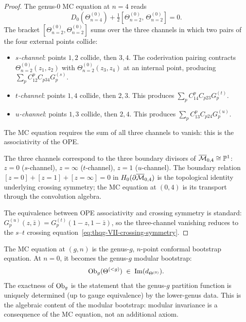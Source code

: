 \begin{proof}
The genus-$0$ MC equation at $n = 4$ reads
\[
D_0(\Theta^{(0)}_{n=4})
+ \tfrac{1}{2}[\Theta^{(0)}_{n=2},\, \Theta^{(0)}_{n=2}]
= 0.
\]
The bracket $[\Theta^{(0)}_{n=2}, \Theta^{(0)}_{n=2}]$
sums over the three channels in which two pairs of the four
external points collide:
\begin{itemize}
\item \emph{$s$-channel}: points $1,2$ collide, then $3,4$.
 The coderivation pairing contracts
 $\Theta^{(0)}_{n=2}(z_1, z_2)$ with
 $\Theta^{(0)}_{n=2}(z_3, z_4)$ at an internal point,
 producing $\sum_p C_{12}^p C_{p34} G_p^{(s)}$.
\item \emph{$t$-channel}: points $1,4$ collide, then $2,3$.
 This produces $\sum_p C_{14}^p C_{p23} G_p^{(t)}$.
\item \emph{$u$-channel}: points $1,3$ collide, then $2,4$.
 This produces $\sum_p C_{13}^p C_{p24} G_p^{(u)}$.
\end{itemize}
The MC equation requires the sum of all three channels to
vanish: this is the associativity of the OPE.

The three channels correspond to the three boundary divisors of
$\overline{\mathcal{M}}_{0,4} \cong \mathbb{P}^1$:
$z = 0$ ($s$-channel), $z = \infty$ ($t$-channel),
$z = 1$ ($u$-channel). The boundary relation
$[z{=}0] + [z{=}1] + [z{=}\infty] = 0$ in
$H_0(\partial\overline{\mathcal{M}}_{0,4})$ is the topological identity
underlying crossing symmetry; the MC equation at $(0,4)$ is its
transport through the convolution algebra.

The equivalence between OPE associativity and crossing symmetry
is standard:
$G_p^{(u)}(z, \bar{z}) = G_p^{(t)}(1-z, 1-\bar{z})$, so
the three-channel vanishing reduces to the
$s$--$t$ crossing equation~\eqref{eq:thqg-VII-crossing-symmetry}.
\end{proof}

\begin{corollary}
\label{cor:thqg-VII-genus-g-bootstrap}
The MC equation at $(g, n)$ is the genus-$g$, $n$-point
conformal bootstrap equation. At $n = 0$, it becomes the
genus-$g$ modular bootstrap:
\begin{equation}\label{eq:thqg-VII-genus-g-bootstrap}
\mathrm{Ob}_g(\Theta^{(<g)}) \;\in\; \mathrm{Im}(d_{\Theta^{(0)}}).
\end{equation}
The exactness of $\mathrm{Ob}_g$ is the statement that the genus-$g$
partition function is uniquely determined \textup{(}up to gauge
equivalence\textup{)} by the lower-genus data. This is the
algebraic content of the modular bootstrap: modular invariance
is a consequence of the MC equation, not an additional axiom.
\end{corollary}

